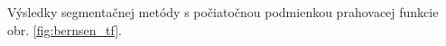 \documentclass[a4paper,11pt,oneside]{article}%
\begin{document}
Výsledky segmentačnej metódy s počiatočnou podmienkou prahovacej funkcie obr. \ref{fig:bernsen_tf}.

\begin{figure}[H]  
    \hspace{5px}

\end{figure}
\end{document}
